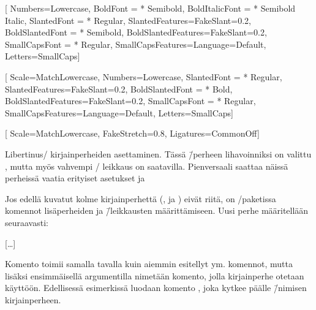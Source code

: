 \begin{esimerkki*}
\begin{koodilohko}
\setmainfont{Libertinus Serif}[
  Numbers=Lowercase,
  BoldFont        = {* Semibold},
  BoldItalicFont  = {* Semibold Italic},
  SlantedFont     = {* Regular},  SlantedFeatures={FakeSlant=0.2},
  BoldSlantedFont = {* Semibold}, BoldSlantedFeatures={FakeSlant=0.2},
  SmallCapsFont   = {* Regular},  SmallCapsFeatures={Language=Default,
                                                     Letters=SmallCaps}]

\setsansfont{Libertinus Sans}[
  Scale=MatchLowercase, Numbers=Lowercase,
  SlantedFont     = {* Regular}, SlantedFeatures={FakeSlant=0.2},
  BoldSlantedFont = {* Bold},    BoldSlantedFeatures={FakeSlant=0.2},
  SmallCapsFont   = {* Regular}, SmallCapsFeatures={Language=Default,
                                                    Letters=SmallCaps}]

\setmonofont{Libertinus Mono}[
  Scale=MatchLowercase, FakeStretch=0.8, Ligatures=CommonOff]
\end{koodilohko}
  \caption{Libertinus\-/ kirjainperheiden asettaminen. Tässä
     \=/perheen lihavoinniksi on valittu
    , mutta myös vahvempi \-/ leikkaus
    on saatavilla. Pienversaali saattaa näissä perheissä vaatia
    erityiset asetukset  ja
    }
  \label{esim/fontit-leik-libertinus}
\end{esimerkki*}

Jos edellä kuvatut kolme kirjainperhettä (,
 ja ) eivät riitä, on
\-/paketissa komennot lisäperheiden ja \=/leikkausten
määrittämiseen. Uusi perhe määritellään seu\-raa\-vasti:

\begin{koodilohkosis}
[…]
\end{koodilohkosis}

\noindent
Komento  toimii samalla tavalla kuin aiemmin
esitellyt  ym. komennot, mutta lisäksi
ensimmäisellä argumentilla nimetään komento, jolla kirjainperhe otetaan
käyttöön. Edellisessä esimerkissä luodaan komento
, joka kytkee päälle 
\=/nimisen kirjainperheen.

